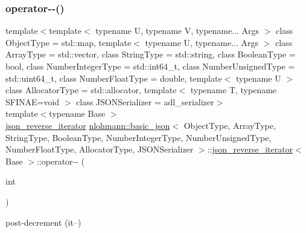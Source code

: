 \subsubsection{\texorpdfstring{operator-\/-\/()}{operator--()}\hspace{0.1cm}{\footnotesize\ttfamily [1/2]}}
{\footnotesize\ttfamily template$<$template$<$ typename U, typename V, typename... Args $>$ class Object\+Type = std\+::map, template$<$ typename U, typename... Args $>$ class Array\+Type = std\+::vector, class String\+Type  = std\+::string, class Boolean\+Type  = bool, class Number\+Integer\+Type  = std\+::int64\+\_\+t, class Number\+Unsigned\+Type  = std\+::uint64\+\_\+t, class Number\+Float\+Type  = double, template$<$ typename U $>$ class Allocator\+Type = std\+::allocator, template$<$ typename T, typename S\+F\+I\+N\+A\+E=void $>$ class J\+S\+O\+N\+Serializer = adl\+\_\+serializer$>$ \\
template$<$typename Base $>$ \\
\hyperlink{classnlohmann_1_1basic__json_1_1json__reverse__iterator}{json\+\_\+reverse\+\_\+iterator} \hyperlink{classnlohmann_1_1basic__json}{nlohmann\+::basic\+\_\+json}$<$ Object\+Type, Array\+Type, String\+Type, Boolean\+Type, Number\+Integer\+Type, Number\+Unsigned\+Type, Number\+Float\+Type, Allocator\+Type, J\+S\+O\+N\+Serializer $>$\+::\hyperlink{classnlohmann_1_1basic__json_1_1json__reverse__iterator}{json\+\_\+reverse\+\_\+iterator}$<$ Base $>$\+::operator-\/-\/ (\begin{DoxyParamCaption}\item[{int}]{ }\end{DoxyParamCaption})\hspace{0.3cm}{\ttfamily [inline]}}



post-\/decrement (it--) 

\mbox{\label{classnlohmann_1_1basic__json_1_1json__reverse__iterator_ae446e535faf6bf4a20d75ffc8525d20d}} 
